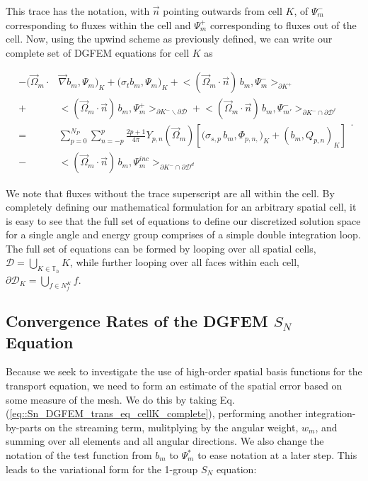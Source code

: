 \noindent This trace has the notation, with $\vec{n}$ pointing outwards from cell $K$, of $\Psi_m^-$ corresponding to fluxes within the cell and $\Psi_m^+$ corresponding to fluxes out of the cell. Now, using the upwind scheme as previously defined, we can write our complete set of DGFEM equations for cell $K$ as

\begin{equation}
\label{eq::Sn_DGFEM_trans_eq_cellK_complete}
\begin{aligned}
-  \Big( \vec{\Omega}_m \cdot  & \vec{\nabla} b_m, \Psi_{m} \Big)_{K}   + \Big(  \sigma_{t} b_m ,   \Psi_{m} \Big)_{K} +  \Big< ( \vec{\Omega}_m \cdot \vec{n} ) \, b_m, {\Psi}_m^{-}  \Big>_{\partial K^+}  \\
  + & \Big< ( \vec{\Omega}_m \cdot \vec{n} ) \, b_m, {\Psi}_m^{+}  \Big>_{\partial K^- \backslash \partial \mathcal{D}}  + \Big< ( \vec{\Omega}_m \cdot \vec{n} ) \, b_m, {\Psi}^{-}_{m'}  \Big>_{\partial K^- \cap \partial \mathcal{D}^r}  \\
= & \sum_{p=0}^{N_P} \sum_{n=-p}^{p} \frac{2p + 1}{4 \pi}  Y_{p,n} (  \vec{\Omega}_m ) \left[ \Big( \sigma_{s,p} \, b_m,  \Phi_{p,n,} \Big)_{K}  + \left(  b_m ,   Q_{p,n} \right)_{K} \right] \\
- & \Big< ( \vec{\Omega}_m \cdot \vec{n} ) \, b_m, {\Psi}_m^{inc}  \Big>_{\partial K^- \cap \partial \mathcal{D}^d}
\end{aligned} .
\end{equation} 

\noindent We note that fluxes without the trace superscript are all within the cell. By completely defining our mathematical formulation for an arbitrary spatial cell, it is easy to see that the full set of equations to define our discretized solution space for a single angle and energy group comprises of a simple double integration loop. The full set of equations can be formed by looping over all spatial cells, $\mathcal{D} = \bigcup_{K \in \mathbb{T}_h} K$, while further looping over all faces within each cell, $\partial \mathcal{D}_K = \bigcup_{ f \in N_f^K} f$. 

\subsection{Convergence Rates of the DGFEM $S_N$ Equation}
\label{sec::Sn_Spatial_Convergence}

Because we seek to investigate the use of high-order spatial basis functions for the transport equation, we need to form an estimate of the spatial error based on some measure of the mesh. We do this by taking Eq. (\ref{eq::Sn_DGFEM_trans_eq_cellK_complete}), performing another integration-by-parts on the streaming term, mulitplying by the angular weight, $w_m$, and summing over all elements and all angular directions. We also change the notation of the test function from $b_m$ to $\Psi_m^{*}$ to ease notation at a later step. This leads to the variational form for the 1-group $S_N$ equation:

